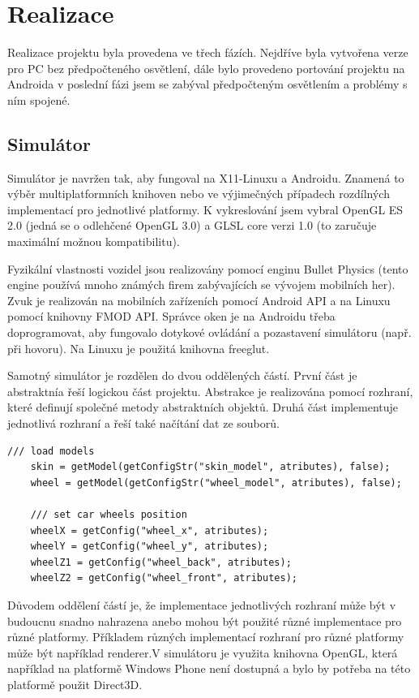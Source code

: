 \documentclass[11pt,twoside,a4paper]{book}
\begin{document}
\chapter{Realizace}
Realizace projektu byla provedena ve třech fázích. Nejdříve byla vytvořena verze pro PC bez předpočteného osvětlení, dále bylo provedeno portování projektu na Android\linebreak a v poslední fázi jsem se zabýval předpočteným osvětlením a problémy s ním spojené.

\section{Simulátor}
Simulátor je navržen tak, aby fungoval na X11-Linuxu a Androidu. Znamená to výběr multiplatformních knihoven nebo ve výjimečných případech rozdílných implementací pro jednotlivé platformy. K vykreslování jsem vybral OpenGL ES 2.0 (jedná se o odlehčené OpenGL 3.0) a GLSL core verzi 1.0 (to zaručuje maximální možnou kompatibilitu).

Fyzikální vlastnosti vozidel jsou realizovány pomocí enginu Bullet Physics (tento engine používá mnoho známých firem zabývajících se vývojem mobilních her). Zvuk je realizován na mobilních zařízeních pomocí Android API a na Linuxu pomocí knihovny FMOD API. Správce oken je na Androidu třeba doprogramovat, aby fungovalo dotykové ovládání a pozastavení simulátoru (např. při hovoru). Na Linuxu je použitá knihovna freeglut.

Samotný simulátor je rozdělen do dvou oddělených částí. První část je abstraktní\linebreak a řeší logickou část projektu. Abstrakce je realizována pomocí rozhraní, které definují společné metody abstraktních objektů. Druhá část implementuje jednotlivá rozhraní a řeší také načítání dat ze souborů.
\lstset{language=C++} 
\begin{lstlisting}[caption=Načtení 3D modelu vozidla pomocí abstraktního přístupu]
    /// load models
    skin = getModel(getConfigStr("skin_model", atributes), false);
    wheel = getModel(getConfigStr("wheel_model", atributes), false);

    /// set car wheels position
    wheelX = getConfig("wheel_x", atributes);
    wheelY = getConfig("wheel_y", atributes);
    wheelZ1 = getConfig("wheel_back", atributes);
    wheelZ2 = getConfig("wheel_front", atributes);
\end{lstlisting}
\newpage

Důvodem oddělení částí je, že implementace jednotlivých rozhraní může být v budoucnu snadno nahrazena anebo mohou být použité různé implementace pro různé platformy. Příkladem různých implementací rozhraní pro různé platformy může být například renderer.\linebreak V simulátoru je využita knihovna OpenGL, která například na platformě Windows Phone není dostupná a bylo by potřeba na této platformě použit Direct3D.
\end{document}

